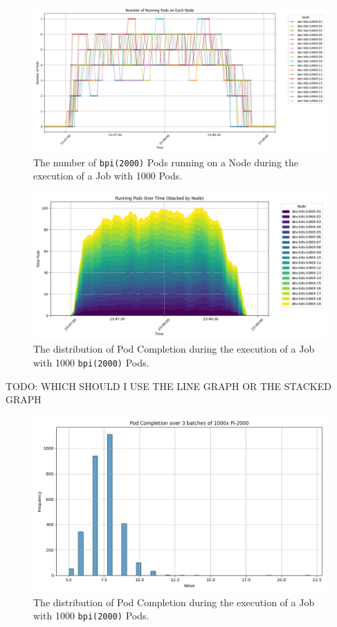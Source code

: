 \begin{figure}[H]
    \centering
    \includegraphics[width=\textwidth]{images/pi-2000-1000x-pod-running.png}
    \caption{The number of \texttt{bpi(2000)} Pods running on a Node during the
    execution of a Job with 1000 Pods.}
    \label{fig:pi-2000-1000x-pod-running}
\end{figure}

\begin{figure}[H]
    \centering
    \includegraphics[width=\textwidth]{images/pi-2000-1000x-pod-running-stacked.png}
    \caption{The distribution of Pod Completion during the execution of a Job
    with 1000 \texttt{bpi(2000)} Pods.}
    \label{fig:pi-2000-1000x-pod-completion}
\end{figure}

TODO: WHICH SHOULD I USE THE LINE GRAPH OR THE STACKED GRAPH

\begin{figure}[H]
    \centering
    \includegraphics[width=\textwidth]{images/pi-2000-1000x-pod-completion.png}
    \caption{The distribution of Pod Completion during the execution of a Job
    with 1000 \texttt{bpi(2000)} Pods.}
    \label{fig:pi-2000-1000x-pod-completion}
\end{figure}

